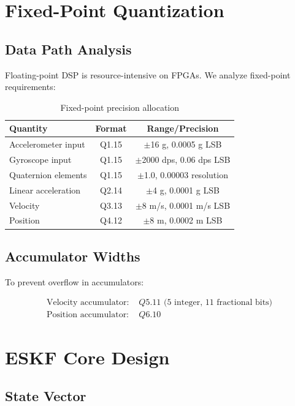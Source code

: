 \section{Fixed-Point Quantization}

\subsection{Data Path Analysis}

Floating-point DSP is resource-intensive on FPGAs. We analyze fixed-point requirements:

\begin{table}[h]
    \centering
    \caption{Fixed-point precision allocation}
    \label{tab:fixed_point}
    \begin{tabular}{lcc}
        \toprule
        \textbf{Quantity} & \textbf{Format} & \textbf{Range/Precision} \\
        \midrule
        Accelerometer input & Q1.15 & $\pm$16 g, 0.0005 g LSB \\
        Gyroscope input & Q1.15 & $\pm$2000 dps, 0.06 dps LSB \\
        Quaternion elements & Q1.15 & $\pm$1.0, 0.00003 resolution \\
        Linear acceleration & Q2.14 & $\pm$4 g, 0.0001 g LSB \\
        Velocity & Q3.13 & $\pm$8 m/s, 0.0001 m/s LSB \\
        Position & Q4.12 & $\pm$8 m, 0.0002 m LSB \\
        \bottomrule
    \end{tabular}
\end{table}

\subsection{Accumulator Widths}

To prevent overflow in accumulators:

\begin{align}
    \text{Velocity accumulator: } & Q5.11 \text{ (5 integer, 11 fractional bits)} \\
    \text{Position accumulator: } & Q6.10
\end{align}

\section{ESKF Core Design}

\subsection{State Vector}

